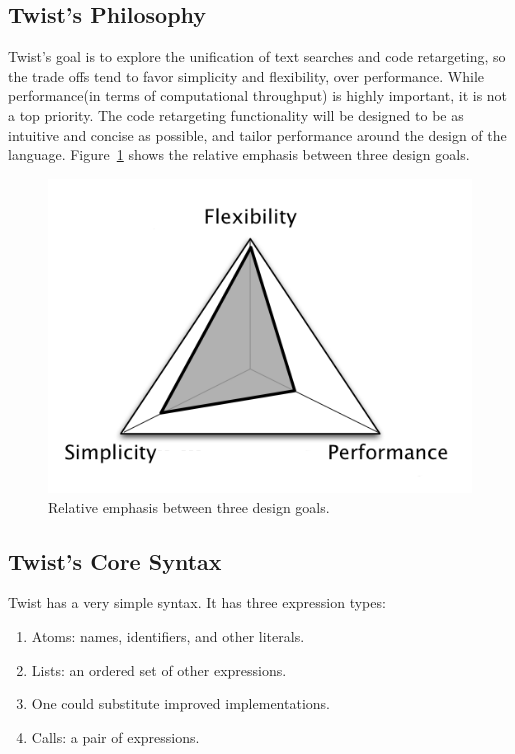 \subsection{Twist's Philosophy}
\label{sec:philosophy}

Twist's goal is to explore the unification of text searches and code retargeting, so the trade offs tend to favor simplicity and flexibility, over performance. While performance(in terms of computational throughput) is highly important, it is not a top priority. The code retargeting functionality will be designed to be as intuitive and concise as possible, and tailor performance around the design of the language. Figure~\ref{fig:focalpoints} shows the relative emphasis between three design goals.

\begin{figure}[!ht]
    \centering
    \includegraphics[width=\textwidth]{images/focalpoints}
    \caption{Relative emphasis between three design goals.}
    \label{fig:focalpoints}
\end{figure}

\subsection{Twist's Core Syntax}
\label{sec:syntax}

Twist has a very simple syntax. It has three expression types: 

\begin{enumerate}
	\item Atoms: names, identifiers, and other literals.
	\item Lists: an ordered set of other expressions. 
	\item One could substitute improved implementations.
	\item Calls: a pair of expressions.
\end{enumerate}

